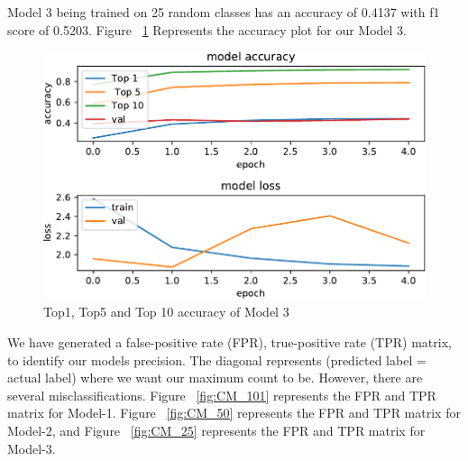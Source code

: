 \documentclass[conference]{IEEEtran}
\begin{document}
\FloatBarrier
Model 3 being trained on 25 random classes has an accuracy of 0.4137 with f1 score of 0.5203. 
Figure ~\ref{fig:acc_loss_25}  Represents the accuracy plot for our Model 3.
\begin{figure}[h]
\centerline
{\includegraphics[width=\columnwidth]{images/acc_loss_25-cropped.pdf}}
\caption{Top1, Top5 and Top 10 accuracy of Model 3}
\label{fig:acc_loss_25}
\end{figure}


\FloatBarrier
We have generated a false-positive rate (FPR), true-positive rate (TPR) matrix, to identify our models precision. The diagonal represents (predicted label = actual label) where we want our maximum count to be. However, there are several misclassifications. Figure ~\ref{fig:CM_101} represents the FPR and TPR matrix for Model-1. Figure ~\ref{fig:CM_50} represents the FPR and TPR matrix for Model-2, and Figure ~\ref{fig:CM_25} represents the FPR and TPR matrix for Model-3.
\end{document}
